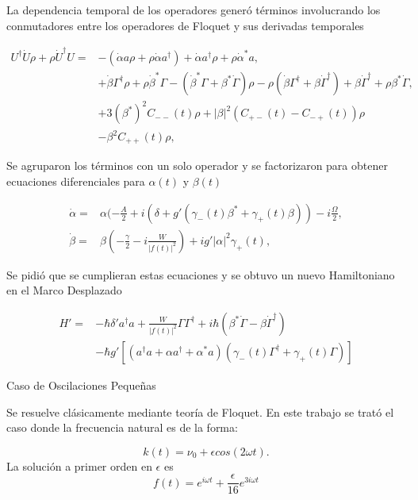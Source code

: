 \documentclass[10pt]{beamer}
\begin{document}
\begin{frame}
La dependencia temporal de los operadores generó términos involucrando los conmutadores entre los operadores de Floquet y sus derivadas temporales

\begin{align*}
U^{\dagger}\dot{U}\rho + \rho \dot{U}^\dagger U =& -(\dot{\alpha}a \rho + \rho\dot{\alpha}a^{\dagger}) + \dot{\alpha}a^{\dagger}\rho + \rho \dot{\alpha}^*a,\\
&+ \dot{\beta}\Gamma^{\dagger}\rho + \rho\dot{\beta}^*\Gamma-(\dot{\beta}^*\Gamma + \beta^*\dot{\Gamma})\rho - \rho(\dot{\beta} \Gamma^{\dagger} + \beta \dot{\Gamma}^{\dagger}) +\beta \dot{\Gamma}^{\dagger} + \rho\beta^* \dot{\Gamma},\\
&+3(\beta^*)^2C_{--}(t)\rho + |\beta|^2(C_{+-}(t) - C_{-+}(t))\rho \\
&-  \beta^2 C_{++}(t)\rho,
\end{align*}
\end{frame}

\begin{frame}
Se agruparon los términos con un solo operador y se factorizaron para obtener ecuaciones diferenciales para $\alpha(t)$ y $\beta(t)$

\begin{align*}
\dot{\alpha} =& \alpha(-\frac{A}{2}+i(\delta+g'(\gamma_-(t) \beta^* + \gamma_+(t) \beta))-i\frac{\Omega}{2},\\
\dot{\beta} =& \beta(-\frac{\gamma}{2}-i\frac{W}{|f(t)|^2})+ig'|\alpha|^2\gamma_+(t),
\end{align*}
\end{frame}

\begin{frame}
Se pidió que se cumplieran estas ecuaciones y se obtuvo un nuevo Hamiltoniano en el Marco Desplazado

\begin{align*}
H'=& \nonumber -\hbar \delta' a^\dagger a + \frac{W}{|f(t)|^2}\Gamma \Gamma^\dagger + i\hbar(\beta^*\dot{\Gamma} - \beta \dot{\Gamma}^\dagger) \\
&-\hbar g'[(a^{\dagger}a +\alpha a^{\dagger}+\alpha^* a)(\gamma_-(t)\Gamma^{\dagger}+\gamma_+(t)\Gamma)]
\end{align*}
\end{frame}

\begin{frame}{Caso de Oscilaciones Pequeñas}

Se resuelve clásicamente mediante teoría de Floquet. En este trabajo se trató el caso donde la frecuencia natural es de la forma:

\begin{equation*}
k(t) = \nu_0 + \epsilon cos(2\omega t).
\end{equation*} La solución a primer orden en $\epsilon$ es
\begin{equation*}
f(t)= e^{i\omega t} + \frac{\epsilon}{16} e^{3i\omega t}
\end{equation*}

\end{frame}
\end{document}
